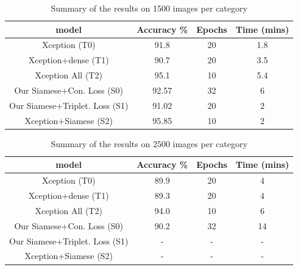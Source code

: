 \begin{table}[ht]
    \caption{Summary of the results on 1500 images per category} 
    \centering 
    \begin{tabular}{c c c c} 
    \hline\hline 
    
    model & Accuracy \% & Epochs & Time (mins)  \\%
    \hline %
    Xception (T0) & 91.8 & 20 & 1.8 \\%
    Xception+dense (T1) & 90.7 & 20 & 3.5 \\%
    Xception All (T2) & 95.1 & 10 & 5.4 \\%
    Our Siamese+Con. Loss (S0) & 92.57 & 32 & 6 \\%
    Our Siamese+Triplet. Loss (S1) & 91.02  & 20& 2 \\%
    Xception+Siamese (S2) & 95.85 & 10 & 2 \\%
    \hline 
    \end{tabular}
\label{table:resultA} %
\end{table}

\begin{table}[ht]
    \caption{Summary of the results on 2500 images per category} 
    \centering 
    \begin{tabular}{c c c c} 
    \hline\hline 
    
    model & Accuracy \% & Epochs & Time (mins)  \\%
    \hline %
    Xception (T0) & 89.9 & 20 & 4 \\%
    Xception+dense (T1) & 89.3 & 20 & 4 \\%
    Xception All (T2) & 94.0 & 10 & 6 \\%
    Our Siamese+Con. Loss (S0) & 90.2 & 32 & 14 \\%
    Our Siamese+Triplet. Loss (S1) & - & - & - \\%
    Xception+Siamese (S2) & - & - & - \\%
    \hline 
    \end{tabular}
\label{table:resultB} %
\end{table}

